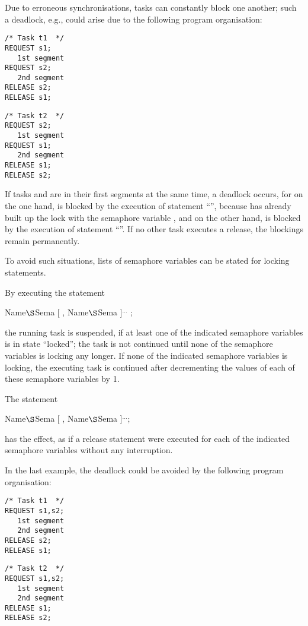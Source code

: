 Due to erroneous synchronisations, tasks can constantly block one
another; such a deadlock, e.g., could arise due to the following program
organisation:

\begin{multicols}{2}
\begin{lstlisting}
/* Task t1  */
REQUEST s1; 
   1st segment 
REQUEST s2; 
   2nd segment 
RELEASE s2; 
RELEASE s1;
\end{lstlisting}
\columnbreak
\begin{lstlisting}
/* Task t2  */
REQUEST s2; 
   1st segment 
REQUEST s1; 
   2nd segment 
RELEASE s1; 
RELEASE s2;
\end{lstlisting}
\end{multicols}

If tasks  and  are in their first segments at the same time, a
deadlock occurs, for on the one hand,  is blocked by the execution of
statement ``'', because  has already built up the lock
with the semaphore variable , and on the other hand,  is blocked by
the execution of statement ``''. If no other task executes
a release, the blockings remain permanently.

To avoid such situations, lists of semaphore variables can be stated for
locking statements.

By executing the statement

 Name$\S $Sema [ , Name$\S $Sema ]$^{...}$ ;

the running task is suspended, if at least one of the indicated semaphore
variables is in state ``locked''; the task is not continued until none
of the semaphore variables is locking any longer. If none of the
indicated semaphore variables is locking, the executing task is
continued after decrementing the values of each of these semaphore variables by 1.

The statement

 Name$\S $Sema [ , Name$\S $Sema ]$^{...}$;

has the effect, as if a release statement were executed for each of
the indicated semaphore variables without any interruption.

In the last example, the deadlock could be avoided by the following
program organisation:

\begin{multicols}{2}
\begin{lstlisting}
/* Task t1  */
REQUEST s1,s2; 
   1st segment 
   2nd segment 
RELEASE s2; 
RELEASE s1;
\end{lstlisting}
\columnbreak
\begin{lstlisting}
/* Task t2  */
REQUEST s1,s2; 
   1st segment 
   2nd segment 
RELEASE s1; 
RELEASE s2;
\end{lstlisting}
\end{multicols}

